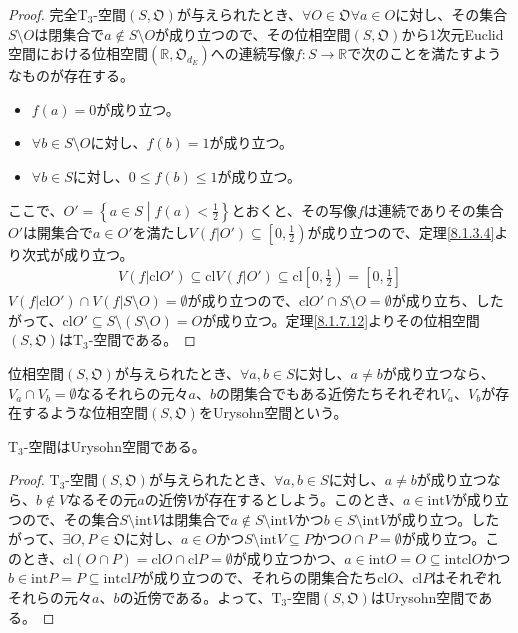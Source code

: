\documentclass[dvipdfmx]{jsarticle}
\begin{document}
\begin{proof}
完全$\mathrm{T}_{3}$-空間$\left( S,\mathfrak{O} \right)$が与えられたとき、$\forall O \in \mathfrak{O\forall}a \in O$に対し、その集合$S \setminus O$は閉集合で$a \notin S \setminus O$が成り立つので、その位相空間$\left( S,\mathfrak{O} \right)$から1次元Euclid空間における位相空間$\left( \mathbb{R},\mathfrak{O}_{d_{E}} \right)$への連続写像$f:S \rightarrow \mathbb{R}$で次のことを満たすようなものが存在する。
\begin{itemize}
\item
  $f(a) = 0$が成り立つ。
\item
  $\forall b \in S \setminus O$に対し、$f(b) = 1$が成り立つ。
\item
  $\forall b \in S$に対し、$0 \leq f(b) \leq 1$が成り立つ。
\end{itemize}
ここで、$O' = \left\{ a \in S \middle| f(a) < \frac{1}{2} \right\}$とおくと、その写像$f$は連続でありその集合$O'$は開集合で$a \in O'$を満たし$V\left( f|O' \right) \subseteq \left[ 0,\frac{1}{2} \right)$が成り立つので、定理\ref{8.1.3.4}より次式が成り立つ。
\begin{align*}
V\left( f|{\mathrm{cl}}O' \right) \subseteq {\mathrm{cl}}{V\left( f|O' \right)} \subseteq {\mathrm{cl}}\left[ 0,\frac{1}{2} \right) = \left[ 0,\frac{1}{2} \right]
\end{align*}
$V\left( f|{\mathrm{cl}}O' \right) \cap V\left( f|S \setminus O \right) = \emptyset$が成り立つので、${\mathrm{cl}}O' \cap S \setminus O = \emptyset$が成り立ち、したがって、${\mathrm{cl}}O' \subseteq S \setminus (S \setminus O) = O$が成り立つ。定理\ref{8.1.7.12}よりその位相空間$\left( S,\mathfrak{O} \right)$は$\mathrm{T}_{3}$-空間である。
\end{proof}
\begin{dfn}
位相空間$\left( S,\mathfrak{O} \right)$が与えられたとき、$\forall a,b \in S$に対し、$a \neq b$が成り立つなら、$V_{a} \cap V_{b} = \emptyset$なるそれらの元々$a$、$b$の閉集合でもある近傍たちそれぞれ$V_{a}$、$V_{b}$が存在するような位相空間$\left( S,\mathfrak{O} \right)$をUrysohn空間という。
\end{dfn}
\begin{thm}\label{8.1.7.25} $\mathrm{T}_{3}$-空間はUrysohn空間である。
\end{thm}
\begin{proof}
$\mathrm{T}_{3}$-空間$\left( S,\mathfrak{O} \right)$が与えられたとき、$\forall a,b \in S$に対し、$a \neq b$が成り立つなら、$b \notin V$なるその元$a$の近傍$V$が存在するとしよう。このとき、$a \in {\mathrm{int}}V$が成り立つので、その集合$S \setminus {\mathrm{int}}V$は閉集合で$a \notin S \setminus {\mathrm{int}}V$かつ$b \in S \setminus {\mathrm{int}}V$が成り立つ。したがって、$\exists O,P \in \mathfrak{O}$に対し、$a \in O$かつ$S \setminus {\mathrm{int}}V \subseteq P$かつ$O \cap P = \emptyset$が成り立つ。このとき、${\mathrm{cl}}(O \cap P) = {\mathrm{cl}}O \cap {\mathrm{cl}}P = \emptyset$が成り立つかつ、$a \in {\mathrm{int}}O = O \subseteq {\mathrm{int}}{{\mathrm{cl}}O}$かつ$b \in {\mathrm{int}}P = P \subseteq {\mathrm{int}}{{\mathrm{cl}}P}$が成り立つので、それらの閉集合たち${\mathrm{cl}}O$、${\mathrm{cl}}P$はそれぞれそれらの元々$a$、$b$の近傍である。よって、$\mathrm{T}_{3}$-空間$\left( S,\mathfrak{O} \right)$はUrysohn空間である。
\end{proof}
\end{document}
